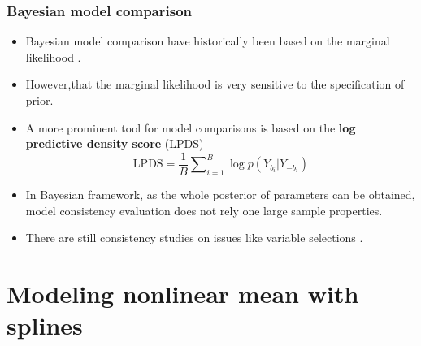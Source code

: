 \documentclass[10pt]{beamer}
\begin{document}
\begin{frame}
  \frametitle{Bayesian model comparison}

  \begin{itemize}
  \item Bayesian model comparison have historically been based on the marginal
    likelihood \citep{kass1995bayes}.

  \item However,that the marginal likelihood is very sensitive to the
    specification of prior.

  \item A more prominent tool for model comparisons is based on the \textbf{log
    predictive density score} (LPDS)
    \[
    \mathrm{LPDS}=\frac{1}{B}\sum\nolimits _{i=1}^{B}\log p(Y_{b_{i}}|Y_{-b_{i}})
    \]

  \item In Bayesian framework, as the whole posterior of parameters can be
    obtained, model consistency evaluation does not rely one large sample
    properties.

  \item There are still consistency studies on issues like variable
    selections \citep{casella2009consistency}.

  \end{itemize}

\end{frame}


\section{Modeling nonlinear mean with splines}
\end{document}
